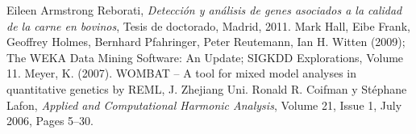 \documentclass[12pt,a4paper,titlepage]{report}
\begin{document}
\begin{thebibliography}{99}
\begin{small}

Eileen Armstrong Reborati, \emph{Detección y análisis de genes asociados a la calidad de la carne en bovinos}, Tesis de doctorado, Madrid, 2011.
Mark Hall, Eibe Frank, Geoffrey Holmes, Bernhard Pfahringer, Peter Reutemann, Ian H. Witten (2009); The WEKA Data Mining Software: An Update; SIGKDD Explorations, Volume 11.
Meyer, K. (2007). WOMBAT – A tool for mixed model analyses in quantitative genetics by REML, J. Zhejiang Uni.
Ronald R. Coifman y Stéphane Lafon, \emph{Applied and Computational Harmonic Analysis}, Volume 21, Issue 1, July 2006, Pages 5–30.

\end{small}
\end{thebibliography}
\end{document}
